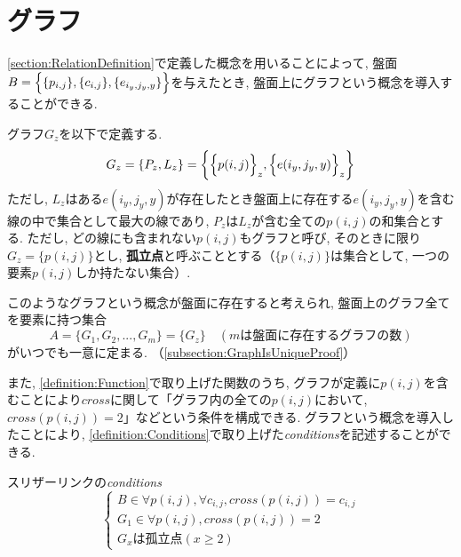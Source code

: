 \section{グラフ}\label{section:GraphDefinition}
\cref{section:RelationDefinition}で定義した概念を用いることによって, 盤面$B=\Bigl\{\{p_{i,j}\},\{c_{i,j}\},\{e_{i_y,j_y,y}\}\Bigr\}$を与えたとき, 盤面上にグラフという概念を導入することができる.

\begin{definition}[グラフ]\label{definition:GraphDefinition}
  グラフ$G_z$を以下で定義する.
  \begin{equation*}
    G_z=\{P_z,L_z\}=\biggl\{  \Bigl\{p(i,j)\Bigr\}_z,\Bigl\{e(i_y,j_y,y)\Bigr\}_z\biggr\}
  \end{equation*}
  ただし, $L_z$はある$e(i_y,j_y,y)$が存在したとき盤面上に存在する$e(i_y,j_y,y)$を含む線の中で集合として最大の線であり, $P_z$は$L_z$が含む全ての$p(i,j)$の和集合とする. ただし, どの線にも含まれない$p(i,j)$もグラフと呼び, そのときに限り$G_z=\{p(i,j)\}$とし, \textbf{孤立点}と呼ぶこととする（$\{p(i,j)\}$は集合として, 一つの要素$p(i,j)$しか持たない集合）.
\end{definition}

このようなグラフという概念が盤面に存在すると考えられ, 盤面上のグラフ全てを要素に持つ集合
\begin{equation*}
  A=\{G_1,G_2,...,G_m\}=\{G_z\}\quad (mは盤面に存在するグラフの数)
\end{equation*}
がいつでも一意に定まる. （\cref{subsection:GraphIsUniqueProof}）

また, \cref{definition:Function}で取り上げた関数のうち, グラフが定義に$p(i,j)$を含むことにより$\textit{cross}$に関して「グラフ内の全ての$p(i,j)$において, $\textit{cross}(p(i,j))=2$」などという条件を構成できる. グラフという概念を導入したことにより, \cref{definition:Conditions}で取り上げた\textit{conditions}を記述することができる.
\begin{example}\textup{スリザーリンクの\textit{conditions}}\label{example:SlitherLinkConditions}
  \begin{equation*}
    \begin{cases}
      {B\in \forall p(i,j)   , \forall c_{i,j} , \textit{cross}(p(i,j))=c_{i,j} } \\
      {G_1\in \forall p(i,j)            , \textit{cross}(p(i,j))=2       }        \\
      {G_xは孤立点(x\geq 2)}
    \end{cases}
  \end{equation*}
\end{example}

